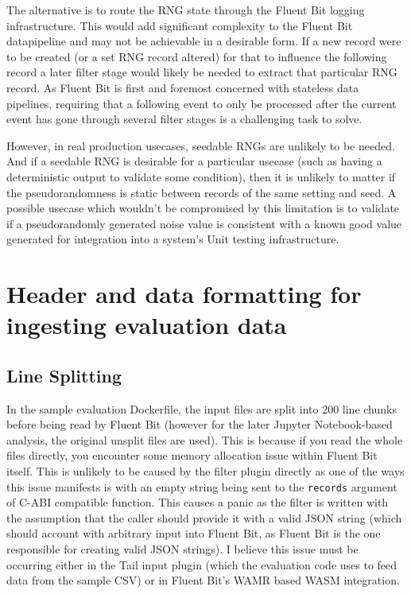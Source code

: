 The alternative is to route the RNG state through the Fluent Bit logging infrastructure. This would add significant complexity to the Fluent Bit datapipeline and may not be achievable in a desirable form. If a new record were to be created (or a set RNG record altered) for that to influence the following record a later filter stage would likely be needed to extract that particular RNG record. As Fluent Bit is first and foremost concerned with stateless data pipelines, requiring that a following event to only be processed after the current event has gone through several filter stages is a challenging task to solve. 

However, in real production usecases, seedable RNGs are unlikely to be needed. And if a seedable RNG is desirable for a particular usecase (such as having a deterministic output to validate some condition), then it is unlikely to matter if the pseudorandomness is static between records of the same setting and seed. A possible usecase which wouldn't be compromised by this limitation is to validate if a pseudorandomly generated noise value is consistent with a known good value generated for integration into a system's Unit testing infrastructure. 


\section{Header and data formatting for ingesting evaluation data}
\subsection{Line Splitting} \label{splitting}
In the sample evaluation Dockerfile, the input files are split into 200 line chunks before being read by Fluent Bit (however for the later Jupyter Notebook-based analysis, the original unsplit files are used). This is because if you read the whole files directly, you encounter some memory allocation issue within Fluent Bit itself. This is unlikely to be caused by the filter plugin directly as one of the ways this issue manifests is with an empty string being sent to the \texttt{records} argument of C-ABI compatible function. This causes a panic as the filter is written with the assumption that the caller should provide it with a valid JSON string (which should account with arbitrary input into Fluent Bit, as Fluent Bit is the one responsible for creating valid JSON strings). I believe this issue must be occurring either in the Tail input plugin (which the evaluation code uses to feed data from the sample CSV) or in Fluent Bit's WAMR based WASM integration. 

